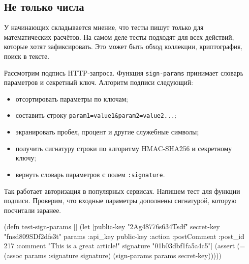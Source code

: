 \subsection{Не только числа}

У начинающих складывается мнение, что тесты пишут только для математических
расчётов. На самом деле тесты подходят для всех действий, которые хотят
зафиксировать. Это может быть обход коллекции, криптография, поиск в тексте.

Рассмотрим подпись HTTP-запроса. Функция \verb|sign-params| принимает словарь
параметров и секретный ключ. Алгоритм подписи следующий:

\begin{itemize}


\item
  отсортировать параметры по ключам;

\item
  составить строку \texttt{param1=value1\&param2\-=va\-lue2...};

\item
  экранировать пробел, процент и другие служебные символы;

\item
  получить сигнатуру строки по алгоритму HMAC-SHA256 и секретному ключу;

\item
  вернуть словарь параметров с полем \texttt{:sig\-na\-tu\-re}.

\end{itemize}


Так работает авторизация в популярных сервисах. Напишем тест для функции
подписи. Проверим, что входные параметры дополнены сигнатурой, которую посчитали
заранее.

\label{hmac-sha256}

\ifx\DEVICETYPE\MOBILE

\begin{english}
  \begin{clojure}
(defn test-sign-params []
  (let [public-key "2Ag48776s634Tsdf"
        secret-key "fnsd809SDf2dfs3t"
        params
        {:api_key public-key
         :action :postComment
         :post_id 217
         :comment
         "This is a great article!"}
        signature "01b03dbf1fa5a4c5"]
    (assert
      (= (assoc params
           :signature signature)
         (sign-params params
           secret-key)))))
  \end{clojure}
\end{english}

